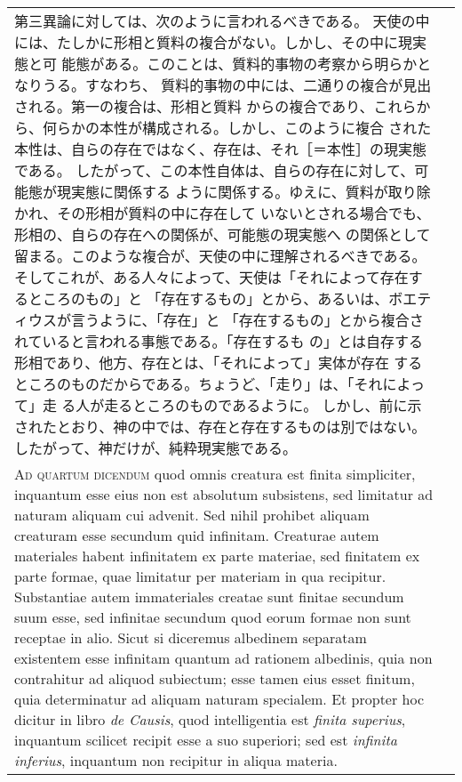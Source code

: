 \documentclass[10pt]{jsarticle} %
\begin{document}
\begin{longtable}{p{21em}p{21em}}
第三異論に対しては、次のように言われるべきである。
天使の中には、たしかに形相と質料の複合がない。しかし、その中に現実態と可
 能態がある。このことは、質料的事物の考察から明らかとなりうる。すなわち、
 質料的事物の中には、二通りの複合が見出される。第一の複合は、形相と質料
 からの複合であり、これらから、何らかの本性が構成される。しかし、このように複合
 された本性は、自らの存在ではなく、存在は、それ［＝本性］の現実態である。
したがって、この本性自体は、自らの存在に対して、可能態が現実態に関係する
 ように関係する。ゆえに、質料が取り除かれ、その形相が質料の中に存在して
 いないとされる場合でも、形相の、自らの存在への関係が、可能態の現実態へ
 の関係として留まる。このような複合が、天使の中に理解されるべきである。
そしてこれが、ある人々によって、天使は「それによって存在するところのもの」と
 「存在するもの」とから、あるいは、ボエティウスが言うように、「存在」と
 「存在するもの」とから複合されていると言われる事態である。「存在するも
 の」とは自存する形相であり、他方、存在とは、「それによって」実体が存在
 するところのものだからである。ちょうど、「走り」は、「それによって」走
 る人が走るところのものであるように。
しかし、前に示されたとおり、神の中では、存在と存在するものは別ではない。
 したがって、神だけが、純粋現実態である。



\\


{\scshape Ad quartum dicendum} quod omnis creatura est
finita simpliciter, inquantum esse eius non est absolutum subsistens,
sed limitatur ad naturam aliquam cui advenit. Sed nihil prohibet aliquam
creaturam esse secundum quid infinitam. Creaturae autem materiales
habent infinitatem ex parte materiae, sed finitatem ex parte formae,
quae limitatur per materiam in qua recipitur. Substantiae autem
immateriales creatae sunt finitae secundum suum esse, sed infinitae
secundum quod eorum formae non sunt receptae in alio. Sicut si diceremus
albedinem separatam existentem esse infinitam quantum ad rationem
albedinis, quia non contrahitur ad aliquod subiectum; esse tamen eius
esset finitum, quia determinatur ad aliquam naturam specialem. Et
propter hoc dicitur in libro {\itshape de Causis}, quod intelligentia est {\itshape finita
superius}, inquantum scilicet recipit esse a suo superiori; sed est
{\itshape infinita inferius}, inquantum non recipitur in aliqua materia.

&


\end{longtable}
\end{document}
